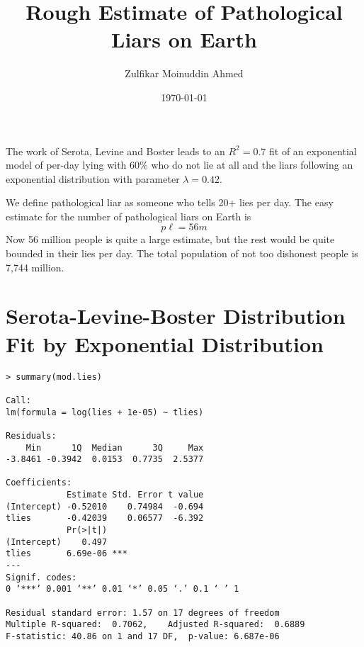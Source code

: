 \documentclass{amsart}
\title{Rough Estimate of Pathological Liars on Earth}
\author{Zulfikar Moinuddin Ahmed}
\date{\today}
\begin{document}
\maketitle

The work of Serota, Levine and Boster \cite{SLB} leads to an $R^2=0.7$ fit of an exponential model of per-day lying with 60\% who do not lie at all and the liars following an exponential distribution with parameter $\lambda=0.42$.

We define pathological liar as someone who tells 20+ lies per day.  The easy estimate for the number of pathological liars on Earth is
\[
p\ell = 56m
\]
Now 56 million people is quite a large estimate, but the rest would be quite bounded in their lies per day.  The total population of not too dishonest people is 7,744 million. 

\section{Serota-Levine-Boster Distribution Fit by Exponential Distribution}

\begin{verbatim}
> summary(mod.lies)

Call:
lm(formula = log(lies + 1e-05) ~ tlies)

Residuals:
    Min      1Q  Median      3Q     Max 
-3.8461 -0.3942  0.0153  0.7735  2.5377 

Coefficients:
            Estimate Std. Error t value
(Intercept) -0.52010    0.74984  -0.694
tlies       -0.42039    0.06577  -6.392
            Pr(>|t|)    
(Intercept)    0.497    
tlies       6.69e-06 ***
---
Signif. codes:  
0 ‘***’ 0.001 ‘**’ 0.01 ‘*’ 0.05 ‘.’ 0.1 ‘ ’ 1

Residual standard error: 1.57 on 17 degrees of freedom
Multiple R-squared:  0.7062,	Adjusted R-squared:  0.6889 
F-statistic: 40.86 on 1 and 17 DF,  p-value: 6.687e-06
\end{verbatim}

\begin{thebibliography}{CCC}

\end{thebibliography}
\end{document}
